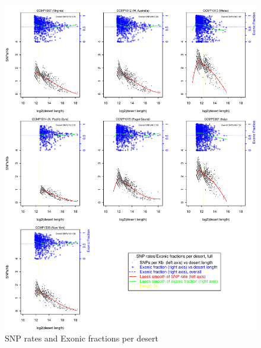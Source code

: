 \documentclass{article}\usepackage[]{graphicx}\usepackage[]{color}
\makeatletter
\def\maxwidth{ %
  \ifdim\Gin@nat@width>\linewidth
    \linewidth
  \else
    \Gin@nat@width
  \fi
}
\newenvironment{kframe}{%
 \def\at@end@of@kframe{}%
 \ifinner\ifhmode%
  \def\at@end@of@kframe{\end{minipage}}%
  \begin{minipage}{\columnwidth}%
 \fi\fi%
 \def\FrameCommand##1{\hskip\@totalleftmargin \hskip-\fboxsep
 \colorbox{shadecolor}{##1}\hskip-\fboxsep
     \hskip-\linewidth \hskip-\@totalleftmargin \hskip\columnwidth}%
 \MakeFramed {\advance\hsize-\width
   \@totalleftmargin\z@ \linewidth\hsize
   \@setminipage}}%
 {\par\unskip\endMakeFramed%
 \at@end@of@kframe}
\newenvironment{knitrout}{}{} %
\makeatother
\begin{document}
\begin{knitrout}
\begin{kframe}
\begin{verbatim}
\end{verbatim}
\end{kframe}\begin{figure}
\includegraphics[width=\maxwidth]{figs-knitr/snp-ex-vs-deslen-full-1} \caption[SNP rates and Exonic fractions per desert]{SNP rates and Exonic fractions per desert}\label{fig:snp-ex-vs-deslen-full}
\end{figure}


\end{knitrout}
\end{document}
